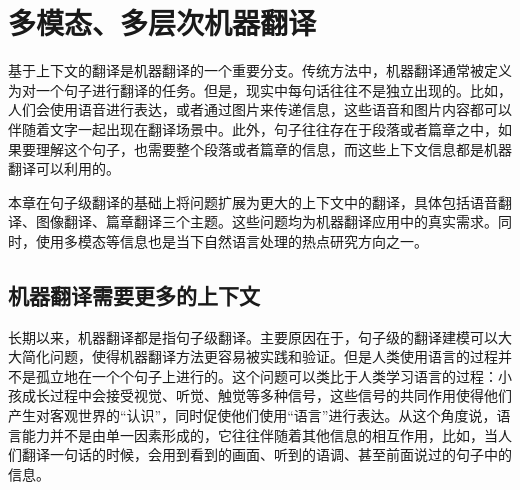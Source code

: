 
%


\renewcommand\figurename{图}%
\renewcommand\tablename{表}%


\chapter{多模态、多层次机器翻译}

\parinterval 基于上下文的翻译是机器翻译的一个重要分支。传统方法中，机器翻译通常被定义为对一个句子进行翻译的任务。但是，现实中每句话往往不是独立出现的。比如，人们会使用语音进行表达，或者通过图片来传递信息，这些语音和图片内容都可以伴随着文字一起出现在翻译场景中。此外，句子往往存在于段落或者篇章之中，如果要理解这个句子，也需要整个段落或者篇章的信息，而这些上下文信息都是机器翻译可以利用的。

\parinterval 本章在句子级翻译的基础上将问题扩展为更大的上下文中的翻译，具体包括语音翻译、图像翻译、篇章翻译三个主题。这些问题均为机器翻译应用中的真实需求。同时，使用多模态等信息也是当下自然语言处理的热点研究方向之一。


\section{机器翻译需要更多的上下文}

\parinterval 长期以来，机器翻译都是指句子级翻译。主要原因在于，句子级的翻译建模可以大大简化问题，使得机器翻译方法更容易被实践和验证。但是人类使用语言的过程并不是孤立地在一个个句子上进行的。这个问题可以类比于人类学习语言的过程：小孩成长过程中会接受视觉、听觉、触觉等多种信号，这些信号的共同作用使得他们产生对客观世界的“认识”，同时促使他们使用“语言”进行表达。从这个角度说，语言能力并不是由单一因素形成的，它往往伴随着其他信息的相互作用，比如，当人们翻译一句话的时候，会用到看到的画面、听到的语调、甚至前面说过的句子中的信息。

